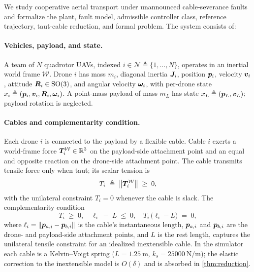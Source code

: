 
We study cooperative aerial transport under unannounced cable-severance faults and formalize the plant, fault model, admissible controller class, reference trajectory, taut-cable reduction, and formal problem. The system consists of:

\paragraph{Vehicles, payload, and state.} A team of $N$ quadrotor UAVs, indexed $i\in\mathcal{N}\triangleq\{1,\dots,N\}$, operates in an inertial world frame $\mathcal{W}$. Drone $i$ has mass $m_i$, diagonal inertia $\boldsymbol{J}_i$, position $\boldsymbol{p}_i$, velocity $\boldsymbol{v}_i$, attitude $\boldsymbol{R}_i\in\mathrm{SO}(3)$, and angular velocity $\boldsymbol{\omega}_i$, with per-drone state $x_i\triangleq(\boldsymbol{p}_i,\boldsymbol{v}_i,\boldsymbol{R}_i,\boldsymbol{\omega}_i)$. A point-mass payload of mass $m_L$ has state $x_L\triangleq(\boldsymbol{p}_L,\boldsymbol{v}_L)$; payload rotation is neglected.

\paragraph{Cables and complementarity condition.} Each drone $i$ is connected to the payload by a flexible cable. Cable $i$ exerts a world-frame force $\boldsymbol{T}_i^{\mathcal{W}} \in \mathbb{R}^3$ on the payload-side attachment point and an equal and opposite reaction on the drone-side attachment point. The cable transmits tensile force only when taut; its scalar tension is
\begin{equation}
 T_i \;\triangleq\; \bigl\|\boldsymbol{T}_i^{\mathcal{W}}\bigr\|
     \;\ge\; 0,
  \label{eq:tension-def}
\end{equation}
with the unilateral constraint $T_i = 0$ whenever the cable is slack. The complementarity condition
\begin{equation}
 T_i \;\ge\; 0, \quad
  \ell_i \;-\; L \;\le\; 0, \quad
 T_i\,\bigl(\ell_i - L\bigr) \;=\; 0,
  \label{eq:complementarity}
\end{equation}
where $\ell_i = \|\boldsymbol{p}_{a, i} - \boldsymbol{p}_{b, i}\|$ is the cable's instantaneous length, $\boldsymbol{p}_{a, i}$ and $\boldsymbol{p}_{b, i}$ are the drone- and payload-side attachment points, and $L$ is the rest length, captures the unilateral tensile constraint for an idealized inextensible cable. In the simulator each cable is a Kelvin--Voigt spring ($L = \SI{1.25}{\metre}$, $k_s = \SI{25000}{\newton\per\metre}$); the elastic correction to the inextensible model is $O(\delta)$ and is absorbed in \cref{thm:reduction}.

